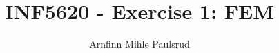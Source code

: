 \documentclass[a4paper, english,10pt]{article}
\begin{document}
\title{INF5620 - Exercise 1: FEM}
\author{Arnfinn Mihle Paulsrud}
\maketitle
%

%
%
%
%
\end{document}
